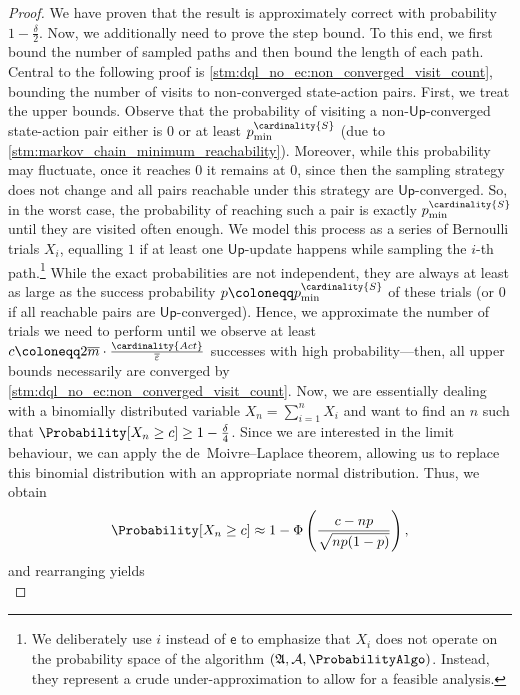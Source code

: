 \documentclass{article}
\newcommand{\States}{S}
\newcommand{\Actions}{Act}
\newcommand{\upperbound}{\mathsf{Up}}
\newcommand{\updatestep}{{\overline{\varepsilon}}}
\newcommand{\delay}{{\overline{m}}}
\newcommand{\algoepisode}{\mathsf{e}}
\newcommand{\algorithmspace}{\mathfrak{A}}
\newcommand{\algorithmsigma}{\mathcal{A}}
\begin{document}
\begin{proof}
	We have proven that the result is approximately correct with probability $1 - \frac{\delta}{2}$.
	Now, we additionally need to prove the step bound.
	To this end, we first bound the number of sampled paths and then bound the length of each path.
	Central to the following proof is \cref{stm:dql_no_ec:non_converged_visit_count}, bounding the number of visits to non-converged state-action pairs.
	First, we treat the upper bounds.
	Observe that the probability of visiting a non-$\upperbound$-converged state-action pair either is $0$ or at least $p_{\min}^{\cardinality{\States}}$ (due to \cref{stm:markov_chain_minimum_reachability}).
	Moreover, while this probability may fluctuate, once it reaches $0$ it remains at $0$, since then the sampling strategy does not change and all pairs reachable under this strategy are $\upperbound$-converged.
	So, in the worst case, the probability of reaching such a pair is exactly $p_{\min}^{\cardinality{\States}}$ until they are visited often enough.
	We model this process as a series of Bernoulli trials $X_i$, equalling $1$ if at least one $\upperbound$-update happens while sampling the $i$-th path.\footnote{We deliberately use $i$ instead of $\algoepisode$ to emphasize that $X_i$ does not operate on the probability space of the algorithm $(\algorithmspace, \algorithmsigma, \ProbabilityAlgo)$.
	Instead, they represent a crude under-approximation to allow for a feasible analysis.}
	While the exact probabilities are not independent, they are always at least as large as the success probability $p \coloneqq p_{\min}^{\cardinality{\States}}$ of these trials (or $0$ if all reachable pairs are $\upperbound$-converged).
	Hence, we approximate the number of trials we need to perform until we observe at least $c \coloneqq 2 \delay \cdot \frac{\cardinality{\Actions}}{\updatestep}$ successes with high probability---then, all upper bounds necessarily are converged by \cref{stm:dql_no_ec:non_converged_visit_count}.
	Now, we are essentially dealing with a binomially distributed variable $X_n = \sum_{i=1}^n X_i$ and want to find an $n$ such that $\Probability[X_n \geq c] \geq 1 - \frac{\delta}{4}$.
	Since we are interested in the limit behaviour, we can apply the de~Moivre--Laplace theorem, allowing us to replace this binomial distribution with an appropriate normal distribution.
	Thus, we obtain
	\begin{equation*}
		\Probability[X_n \geq c] \approx 1 - \Phi \left( \frac{c - np}{\sqrt{np(1-p)}} \right),
	\end{equation*}
	and rearranging yields
	\begin{equation*}

\end{equation*}
\end{proof}
\end{document}
